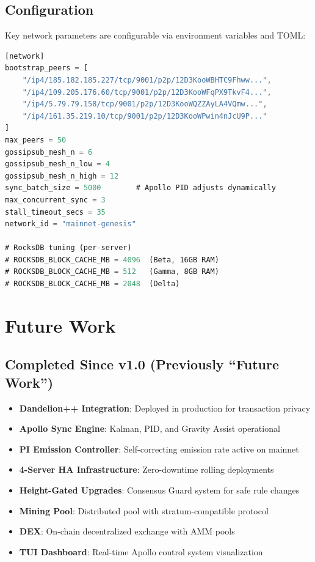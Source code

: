 \documentclass[11pt,a4paper]{article}
\begin{document}
\subsection{Configuration}

Key network parameters are configurable via environment variables and TOML:

\begin{lstlisting}[language=Rust, caption={Network configuration (production defaults)}]
[network]
bootstrap_peers = [
    "/ip4/185.182.185.227/tcp/9001/p2p/12D3KooWBHTC9Fhww...",
    "/ip4/109.205.176.60/tcp/9001/p2p/12D3KooWFqPX9TkvF4...",
    "/ip4/5.79.79.158/tcp/9001/p2p/12D3KooWQZZAyLA4VQmw...",
    "/ip4/161.35.219.10/tcp/9001/p2p/12D3KooWPwin4nJcU9P..."
]
max_peers = 50
gossipsub_mesh_n = 6
gossipsub_mesh_n_low = 4
gossipsub_mesh_n_high = 12
sync_batch_size = 5000        # Apollo PID adjusts dynamically
max_concurrent_sync = 3
stall_timeout_secs = 35
network_id = "mainnet-genesis"

# RocksDB tuning (per-server)
# ROCKSDB_BLOCK_CACHE_MB = 4096  (Beta, 16GB RAM)
# ROCKSDB_BLOCK_CACHE_MB = 512   (Gamma, 8GB RAM)
# ROCKSDB_BLOCK_CACHE_MB = 2048  (Delta)
\end{lstlisting}

\section{Future Work}

\subsection{Completed Since v1.0 (Previously ``Future Work'')}

\begin{itemize}
    \item[$\checkmark$] \textbf{Dandelion++ Integration}: Deployed in production for transaction privacy
    \item[$\checkmark$] \textbf{Apollo Sync Engine}: Kalman, PID, and Gravity Assist operational
    \item[$\checkmark$] \textbf{PI Emission Controller}: Self-correcting emission rate active on mainnet
    \item[$\checkmark$] \textbf{4-Server HA Infrastructure}: Zero-downtime rolling deployments
    \item[$\checkmark$] \textbf{Height-Gated Upgrades}: Consensus Guard system for safe rule changes
    \item[$\checkmark$] \textbf{Mining Pool}: Distributed pool with stratum-compatible protocol
    \item[$\checkmark$] \textbf{DEX}: On-chain decentralized exchange with AMM pools
    \item[$\checkmark$] \textbf{TUI Dashboard}: Real-time Apollo control system visualization
\end{itemize}
\end{document}
